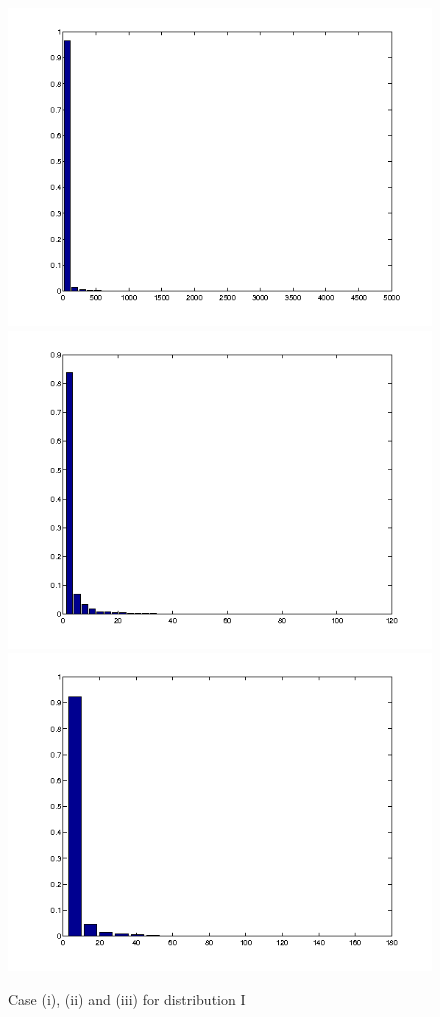\begin{figure}[!htbp]
  \includegraphics[width=\textwidth/2]{p1/gen.png}
  \includegraphics[width=\textwidth/2]{p1/pop.png}
  \includegraphics[width=\textwidth/1]{p1/largest.png}
  \caption{Case (i), (ii) and (iii) for distribution I}
  \label{I}
\end{figure}


